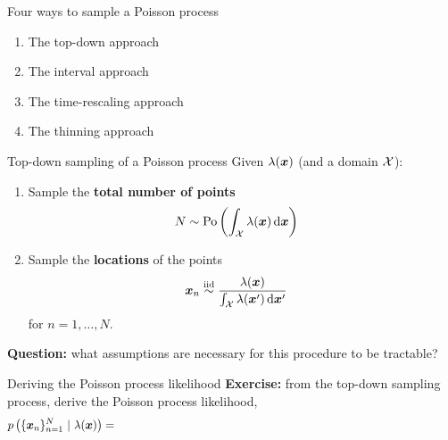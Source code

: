 \documentclass[aspectratio=169]{beamer}
\begin{document}
\begin{frame}{Four ways to sample a Poisson process}
\begin{enumerate}
    \item The top-down approach
    \item The interval approach
    \item The time-rescaling approach
    \item The thinning approach
\end{enumerate}    
\end{frame}

\begin{frame}{Top-down sampling of a Poisson process}
    Given $\lambda(\boldsymbol{x})$ (and a domain $\mathcal{X}$):
    \begin{enumerate}
        \itemsep1em
        \item Sample the \textbf{total number of points} 
        \begin{align}
            N &\sim \mathrm{Po} \left( \int_{\mathcal{X}} \lambda(\boldsymbol{x}) \mathop{}\!\mathrm{d} \boldsymbol{x} \right)
        \end{align}
        
        \item Sample the \textbf{locations} of the points
        \begin{align}
            \boldsymbol{x}_n &\stackrel{\text{iid}}{\sim} \frac{\lambda(\boldsymbol{x})}{\int_{\mathcal{X}} \lambda(\boldsymbol{x}') \mathop{}\!\mathrm{d} \boldsymbol{x}'}
        \end{align}
        for $n=1,\ldots,N$.
    \end{enumerate}
    \textbf{Question: } what assumptions are necessary for this procedure to be tractable?
\end{frame}

\begin{frame}[t]{Deriving the Poisson process likelihood}
    \textbf{Exercise: } from the top-down sampling process, derive the Poisson process likelihood,
    \begin{align}
        p\left(\{\mbx_n\}_{n=1}^N \mid \lambda(\mbx) \right) = \hspace{30em}
    \end{align}
\end{frame}
\end{document}
